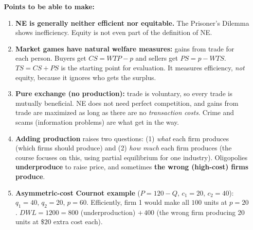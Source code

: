 \documentclass[11pt]{article}
\begin{document}
\textbf{Points to be able to make:}
\begin{enumerate}
\item \textbf{NE is generally neither efficient nor equitable.} The Prisoner's Dilemma shows inefficiency. Equity is not even part of the definition of NE.
\item \textbf{Market games have natural welfare measures:} gains from trade for each person. Buyers get $CS=WTP-p$ and sellers get $PS=p-WTS$. $TS=CS+PS$ is the starting point for evaluation. It measures efficiency, \emph{not} equity, because it ignores who gets the surplus.
\item \textbf{Pure exchange (no production):} trade is voluntary, so every trade is mutually beneficial. NE does not need perfect competition, and gains from trade are maximized as long as there are no \emph{transaction costs}. Crime and scams (information problems) are what get in the way.
\item \textbf{Adding production} raises two questions: (1) \emph{what} each firm produces (which firms should produce) and (2) \emph{how much} each firm produces (the course focuses on this, using partial equilibrium for one industry). Oligopolies \textbf{underproduce} to raise price, and sometimes \textbf{the wrong (high-cost) firms produce}.
\item \textbf{Asymmetric-cost Cournot example} ($P=120-Q$, $c_1=20$, $c_2=40$): $q_1=40$, $q_2=20$, $p=60$. Efficiently, firm 1 would make all $100$ units at $p=20$. $DWL=1200=800$ (underproduction) $+\,400$ (the wrong firm producing 20 units at $\$20$ extra cost each).
\end{enumerate}
\end{document}
